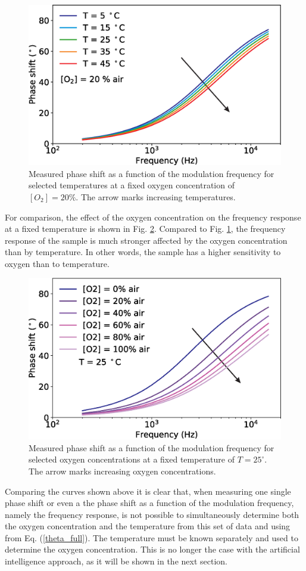 \documentclass[9pt,twocolumn,twoside,pdftex]{optica}
\begin{document}
\begin{figure}[t!]
\centering
\includegraphics[width=8.2 cm]{phase_f_T.eps}
\caption{Measured phase shift as a function of the modulation frequency for selected temperatures at a fixed oxygen concentration of $[O_2]=20 \%$. The arrow marks increasing temperatures.}
\label{fig:expdata2}
\end{figure}

For comparison, the effect of the oxygen concentration on the frequency response at a fixed temperature is shown in Fig. \ref{fig:expdata3}. Compared to Fig. \ref{fig:expdata2}, the frequency response of the sample is much stronger affected by the oxygen concentration than by temperature. In other words, the sample has a higher sensitivity to oxygen than to temperature.

\begin{figure}[hbt]
\centering
\includegraphics[width=8.2 cm]{phase_f_O2.eps}
\caption{Measured phase shift as a function of the modulation frequency for selected oxygen concentrations at a fixed temperature of $T=25 ^{\circ}$. The arrow marks increasing oxygen concentrations.}
\label{fig:expdata3}
\end{figure}

Comparing the curves shown above it is clear that, when measuring one single phase shift or even a the phase shift as a function of the modulation frequency, namely the frequency response, is not possible to simultaneously determine both the oxygen concentration and the temperature from this set of data and using from Eq. (\ref{theta_full}). The temperature must be known separately and used to determine the oxygen concentration. This is no longer the case with the artificial intelligence approach, as it will be shown in the next section. 
\end{document}
